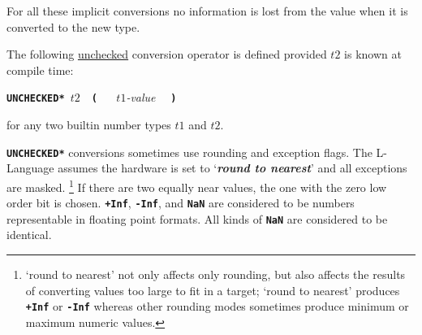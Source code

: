 \documentclass[12pt]{article}
\newcommand{\TT}[1]{{\tt \bfseries #1}}
\newcommand{\key}[1]{{\bf \em #1}\index{#1}}
\begin{document}
For all these implicit conversions no information is lost from
the value when it is converted to the new type.

The following \underline{unchecked}
conversion operator is defined provided $t2$ is known at compile time:
\begin{center}

\TT{*UNCHECKED*~}$t2$~~\TT{(} ~~ $t1${\em -value} ~~\TT{)}%
\label{<<**}

for any two builtin number types $t1$ and $t2$.

\end{center}

\TT{*UNCHECKED*} conversions sometimes use rounding and exception flags.  The
L-Language assumes the hardware is set to `\key{round to nearest}'
and all exceptions are masked.%
\footnote{`round to nearest' not only affects
only rounding, but also affects the results of converting values
too large to fit in a target; `round to nearest' produces \TT{+Inf}
or \TT{-Inf} whereas other rounding modes sometimes produce minimum or
maximum numeric values.}  If there are two equally near values, the one with
the zero low order bit is chosen.
\TT{+Inf}, \TT{-Inf}, and \TT{NaN}
are considered to be numbers representable in floating point formats.
All kinds of \TT{NaN} are considered to be identical.
\end{document}
